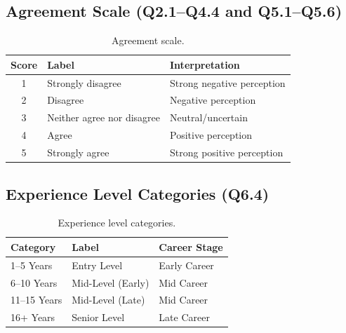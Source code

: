   \subsection{Agreement Scale (Q2.1--Q4.4 and Q5.1--Q5.6)}

  \begin{table}[H]
    \centering
    \caption{Agreement scale.}
    \label{tab:agreement-scale}
    \begin{tabular}{@{}cll@{}}
      \toprule
      \textbf{Score} & \textbf{Label} & \textbf{Interpretation} \\
      \midrule
      1 & Strongly disagree & Strong negative perception \\
      2 & Disagree & Negative perception \\
      3 & Neither agree nor disagree & Neutral/uncertain \\
      4 & Agree & Positive perception \\
      5 & Strongly agree & Strong positive perception \\
      \bottomrule
    \end{tabular}
  \end{table}

  \subsection{Experience Level Categories (Q6.4)}

  \begin{table}[H]
    \centering
    \caption{Experience level categories.}
    \label{tab:experience-levels}
    \begin{tabular}{@{}lll@{}}
      \toprule
      \textbf{Category} & \textbf{Label} & \textbf{Career Stage} \\
      \midrule
      1--5 Years & Entry Level & Early Career \\
      6--10 Years & Mid-Level (Early) & Mid Career \\
      11--15 Years & Mid-Level (Late) & Mid Career \\
      16+ Years & Senior Level & Late Career \\
      \bottomrule
    \end{tabular}
  \end{table}
